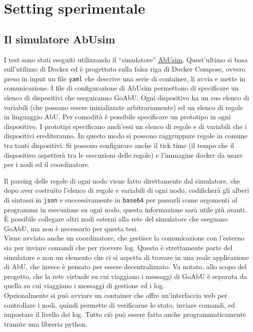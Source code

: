 \documentclass[12pt, a4paper]{article}
\begin{document}
\section{Setting sperimentale}

\subsection{Il simulatore AbUsim}\label{setting:abusim}

I test sono stati eseguiti utilizzando il ``simulatore'' \href{https://github.com/abu-lang/abusim}{AbUsim}. Quest'ultimo si basa sull'utilizzo di Docker ed è progettato sulla falsa riga di Docker Compose, ovvero preso in input un file \lstinline{yaml} che descrive una serie di container, li avvia e mette in comunicazione.
I file di configurazione di AbUsim permettono di specificare un elenco di dispositivi che eseguiranno GoAbU. Ogni dispositivo ha un suo elenco di variabili (che possono essere inizializzate arbitrariamente) ed un elenco di regole in linguaggio AbU.
Per comodità è possibile specificare un prototipo in ogni dispositivo. I prototipi specificano anch'essi un elenco di regole e di variabili che i dispositivi erediteranno. In questo modo si possono raggruppare regole in comune tra tanti dispositivi.
Si possono configurare anche il tick time (il tempo che il dispositivo aspetterà tra le esecuzioni delle regole) e l'immagine docker da usare per i nodi ed il coordinatore.

Il parsing delle regole di ogni nodo viene fatto direttamente dal simulatore, che dopo aver costruito l'elenco di regole e variabili di ogni nodo, codificherà gli alberi di sintassi in \lstinline{json} e successivamente in \lstinline{base64} per passarli come argomenti al programma in esecuzione su ogni nodo, questa informazione sarà utile più avanti. È possibile collegare altri nodi esterni alla rete del simulatore che eseguano GoAbU, ma non è necessario per questa tesi.\\
Viene avviato anche un coordinatore, che gestisce la comunicazione con l'esterno sia per inviare comandi che per ricevere log. Questo è strettamente parte del simulatore e non un elemento che ci si aspetta di trovare in una reale applicazione di AbU, che invece è pensato per essere decentralizzato. Va notato, allo scopo del progetto, che la rete virtuale su cui viaggiano i messaggi di GoAbU è separata da quella su cui viaggiano i messaggi di gestione ed i log.\\
Opzionalmente si può avviare un container che offre un'interfaccia web per controllare i nodi, quindi permette di verificarne lo stato, inviare comandi, ed impostare il livello dei log. Tutto ciò può essere fatto anche programmaticamente tramite una libreria python.
\end{document}
